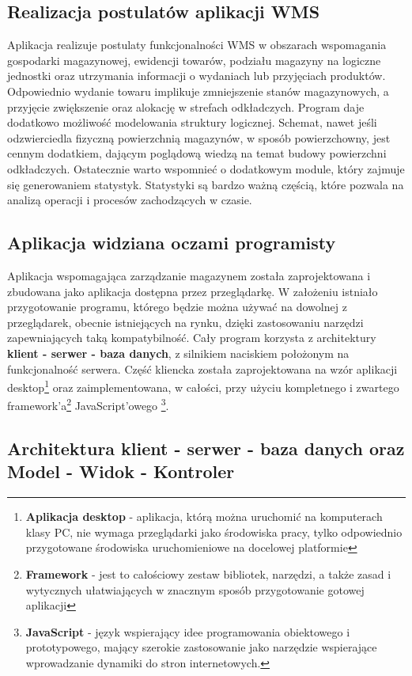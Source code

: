 	\subsection{Realizacja postulatów aplikacji WMS}
		Aplikacja realizuje postulaty funkcjonalności WMS w obszarach wspomagania gospodarki magazynowej,
		ewidencji towarów, podziału magazyny na logiczne jednostki oraz utrzymania informacji
		o wydaniach lub przyjęciach produktów. Odpowiednio wydanie towaru implikuje zmniejszenie stanów
		magazynowych, a przyjęcie zwiększenie oraz alokację w strefach odkładczych. 
		Program daje dodatkowo możliwość modelowania struktury logicznej. Schemat, nawet jeśli odzwierciedla
		fizyczną powierzchnią magazynów, w sposób powierzchowny, jest cennym dodatkiem, dającym
		poglądową wiedzą na temat budowy powierzchni odkładczych. 
		Ostatecznie warto wspomnieć o dodatkowym module, który zajmuje się generowaniem statystyk.
		Statystyki są bardzo ważną częścią, które pozwala na analizą operacji i procesów zachodzących
		w czasie.
	\subsection{Aplikacja widziana oczami programisty}
		Aplikacja wspomagająca zarządzanie magazynem została zaprojektowana i zbudowana jako aplikacja
		dostępna przez przeglądarkę. W założeniu istniało przygotowanie programu, którego będzie można
		używać na dowolnej z przeglądarek, obecnie istniejących na rynku, dzięki zastosowaniu
		narzędzi zapewniających taką kompatybilność. Cały program korzysta z architektury
		\textbf{klient - serwer - baza danych}, z silnikiem naciskiem położonym na funkcjonalność
		serwera. Część kliencka została zaprojektowana na wzór aplikacji desktop\footnote{
			\textbf{Aplikacja desktop} - aplikacja, którą można uruchomić na komputerach klasy PC,
			nie wymaga przeglądarki jako środowiska pracy, tylko odpowiednio przygotowane
			środowiska uruchomieniowe na docelowej platformie		
		} oraz zaimplementowana, w całości, przy użyciu kompletnego i zwartego framework'a\footnote{
			\textbf{Framework} - jest to całościowy zestaw bibliotek, narzędzi, a także zasad i wytycznych
			ułatwiających w znacznym sposób przygotowanie gotowej aplikacji		
		} JavaScript'owego \footnote{
			\textbf{JavaScript} - język wspierający idee programowania obiektowego i prototypowego, mający
			szerokie zastosowanie jako narzędzie wspierające wprowadzanie dynamiki do stron
			internetowych. 		
		}.
	\subsection{Architektura klient - serwer - baza danych oraz Model - Widok - Kontroler}
